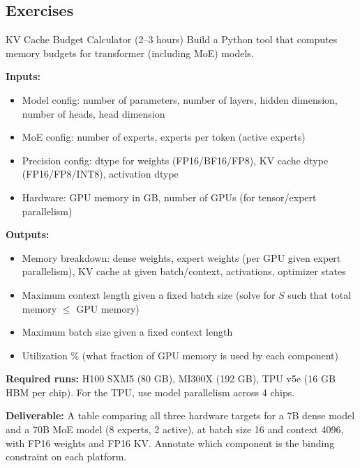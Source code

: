 \subsection{Exercises}

\begin{exercise}{KV Cache Budget Calculator (2--3 hours)}
Build a Python tool that computes memory budgets for transformer (including MoE) models.

\textbf{Inputs:}
\begin{itemize}
  \item Model config: number of parameters, number of layers, hidden dimension, number of heads, head dimension
  \item MoE config: number of experts, experts per token (active experts)
  \item Precision config: dtype for weights (FP16/BF16/FP8), KV cache dtype (FP16/FP8/INT8), activation dtype
  \item Hardware: GPU memory in GB, number of GPUs (for tensor/expert parallelism)
\end{itemize}

\textbf{Outputs:}
\begin{itemize}
  \item Memory breakdown: dense weights, expert weights (per GPU given expert parallelism), KV cache at given batch/context, activations, optimizer states
  \item Maximum context length given a fixed batch size (solve for $S$ such that total memory $\leq$ GPU memory)
  \item Maximum batch size given a fixed context length
  \item Utilization \% (what fraction of GPU memory is used by each component)
\end{itemize}

\textbf{Required runs:} H100 SXM5 (80 GB), MI300X (192 GB), TPU v5e (16 GB HBM per chip). For the TPU, use model parallelism across 4 chips.

\textbf{Deliverable:} A table comparing all three hardware targets for a 7B dense model and a 70B MoE model (8 experts, 2 active), at batch size 16 and context 4096, with FP16 weights and FP16 KV. Annotate which component is the binding constraint on each platform.
\end{exercise}

